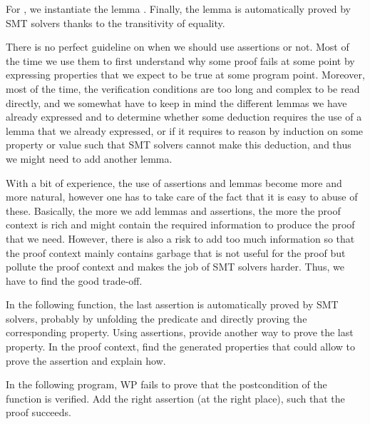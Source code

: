 For , we instantiate the lemma
. Finally, the lemma
 is automatically proved by SMT solvers
thanks to the transitivity of equality.




There is no perfect guideline on when we should use assertions or not. Most of
the time we use them to first understand why some proof fails at some point by
expressing properties that we expect to be true at some program point. Moreover,
most of the time, the verification conditions are too long and complex to be read
directly, and we somewhat have to keep in mind the different lemmas we have
already expressed and to determine whether some deduction requires the use of
a lemma that we already expressed, or if it requires to reason by induction on
some property or value such that SMT solvers cannot make this deduction, and thus
we might need to add another lemma.



With a bit of experience, the use of assertions and lemmas become more and more
natural, however one has to take care of the fact that it is easy to abuse of
these. Basically, the more we add lemmas and assertions, the more the proof
context is rich and might contain the required information to produce the proof
that we need. However, there is also a risk to add too much information so that
the proof context mainly contains garbage that is not useful for the proof but
pollute the proof context and makes the job of SMT solvers harder. Thus, we have
to find the good trade-off.






In the following function, the last assertion is automatically proved by SMT
solvers, probably by unfolding the predicate and directly proving the
corresponding property. Using assertions, provide another way to prove the
last property. In the proof context, find the generated properties that could
allow to prove the assertion and explain how.








In the following program, WP fails to prove that the postcondition of the
function  is verified. Add the right assertion (at the right
place), such that the proof succeeds.



